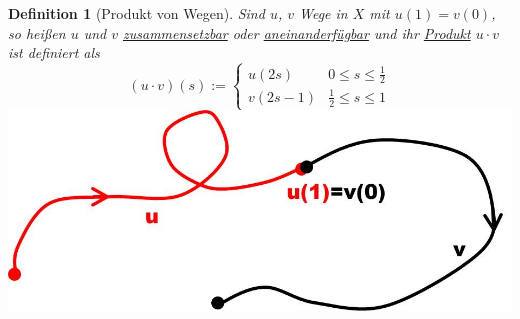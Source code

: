 \documentclass[a4paper,11pt,notitlepage]{report}
\newtheorem{definition}{Definition}[chapter]
\begin{document}
\begin{definition}[Produkt von Wegen]
	Sind $u$, $v$ Wege in $X$ mit $u(1)=v(0)$, so heißen $u$ und $v$ \underline{zusammensetzbar} oder \underline{aneinanderfügbar} und ihr \underline{Produkt} $u \cdot v$ ist definiert als
	$$(u \cdot v) (s) := \begin{cases} u(2s) & 0 \leq s \leq \frac{1}{2} \\ v(2s-1) & \frac{1}{2} \leq s \leq 1 \end{cases}$$
	\includegraphics[scale=0.4]{images/aneinanderfuegbar.jpg}
\end{definition}
\end{document}
